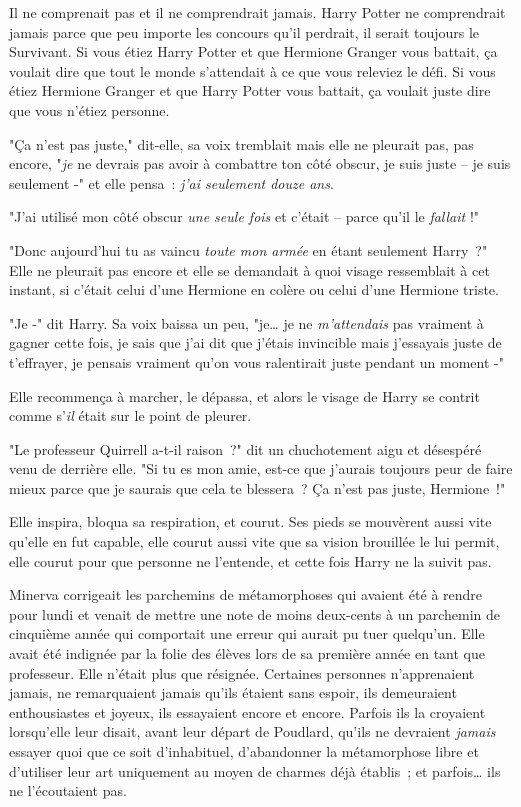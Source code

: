 Il ne comprenait pas et il ne comprendrait jamais. Harry Potter ne comprendrait jamais parce que peu importe les concours qu'il perdrait, il serait toujours le Survivant. Si vous étiez Harry Potter et que Hermione Granger vous battait, ça voulait dire que tout le monde s'attendait à ce que vous releviez le défi. Si vous étiez Hermione Granger et que Harry Potter vous battait, ça voulait juste dire que vous n'étiez personne.

"Ça n'est pas juste," dit-elle, sa voix tremblait mais elle ne pleurait pas, pas encore, "\emph{je} ne devrais pas avoir à combattre ton côté obscur, je suis juste -- je suis seulement -" et elle pensa~: \emph{j'ai seulement douze ans}.

"J'ai utilisé mon côté obscur \emph{une seule fois} et c'était -- parce qu'il le \emph{fallait} !"

"Donc aujourd'hui tu as vaincu \emph{toute mon armée} en étant seulement Harry~?" Elle ne pleurait pas encore et elle se demandait à quoi visage ressemblait à cet instant, si c'était celui d'une Hermione en colère ou celui d'une Hermione triste.

"Je -" dit Harry. Sa voix baissa un peu, "je… je ne \emph{m'attendais} pas vraiment à gagner cette fois, je sais que j'ai dit que j'étais invincible mais j'essayais juste de t'effrayer, je pensais vraiment qu'on vous ralentirait juste pendant un moment -"

Elle recommença à marcher, le dépassa, et alors le visage de Harry se contrit comme s'\emph{il} était sur le point de pleurer.

"Le professeur Quirrell a-t-il raison~?" dit un chuchotement aigu et désespéré venu de derrière elle. "Si tu es mon amie, est-ce que j'aurais toujours peur de faire mieux parce que je saurais que cela te blessera~? Ça n'est pas juste, Hermione~!"

Elle inspira, bloqua sa respiration, et courut. Ses pieds se mouvèrent aussi vite qu'elle en fut capable, elle courut aussi vite que sa vision brouillée le lui permit, elle courut pour que personne ne l'entende, et cette fois Harry ne la suivit pas.

\later

Minerva corrigeait les parchemins de métamorphoses qui avaient été à rendre pour lundi et venait de mettre une note de moins deux-cents à un parchemin de cinquième année qui comportait une erreur qui aurait pu tuer quelqu'un. Elle avait été indignée par la folie des élèves lors de sa première année en tant que professeur. Elle n'était plus que résignée. Certaines personnes n'apprenaient jamais, ne remarquaient jamais qu'ils étaient sans espoir, ils demeuraient enthousiastes et joyeux, ils essayaient encore et encore. Parfois ils la croyaient lorsqu'elle leur disait, avant leur départ de Poudlard, qu'ils ne devraient \emph{jamais} essayer quoi que ce soit d'inhabituel, d'abandonner la métamorphose libre et d'utiliser leur art uniquement au moyen de charmes déjà établis~; et parfois… ils ne l'écoutaient pas.


